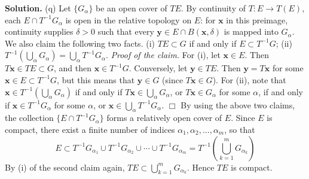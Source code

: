 \documentclass[12pt]{article}
\theoremstyle{definition}
\begin{document}
\smallskip
\noindent\textbf{Solution.}\quad
(q) Let $\{G_\alpha\}$ be an open cover of $TE$.  By continuity of $T:E\to T(E)$, each $E\cap T^{-1}G_\alpha$ is open in the relative topology on $E$: for $\mathbf{x}$ in this preimage, continuity supplies $\delta>0$ such that every $\mathbf y\in E\cap B(\mathbf x,\delta)$ is mapped into $G_\alpha$.
We also claim the following two facts.
(i) $TE\subset G$ if and only if $E\subset T^{-1}G$;
(ii) $T^{-1}\left(\bigcup_{\alpha}G_\alpha\right)=\bigcup_{\alpha}T^{-1}G_\alpha$.
\textit{Proof of the claim.} For (i), let $\mathbf{x}\in E$. Then $T\mathbf{x}\in TE\subset G$, and then $\mathbf{x}\in T^{-1}G$. Conversely, let $\mathbf{y}\in TE$. Then $\mathbf{y}=T\mathbf{x}$ for some $\mathbf{x}\in E\subset T^{-1}G$, but this means that $\mathbf{y}\in G$ (since $T\mathbf{x}\in G$). For (ii), note that $\mathbf{x}\in T^{-1}\left(\bigcup_{\alpha}G_\alpha\right)$ if and only if $T\mathbf{x}\in\bigcup_{\alpha}G_\alpha$, or $T\mathbf{x}\in G_{\alpha}$ for some $\alpha$, if and only if $\mathbf{x}\in T^{-1}G_\alpha$ for some $\alpha$, or $\mathbf{x}\in\bigcup_{\alpha}T^{-1}G_\alpha$. $\Box$
By using the above two claims, the collection $\{E\cap T^{-1}G_\alpha\}$ forms a relatively open cover of $E$. Since $E$ is compact, there exist a finite number of indices $\alpha_1,\alpha_2,\ldots,\alpha_m$, so that
$$
E\subset T^{-1}G_{\alpha_1}\cup T^{-1}G_{\alpha_2}\cup\cdots\cup T^{-1}G_{\alpha_m}
=T^{-1}\left(\bigcup_{k=1}^mG_{\alpha_k}\right)
$$
By (i) of the second claim again, $TE\subset \bigcup_{k=1}^mG_{\alpha_k}$. Hence $TE$ is compact.
\end{document}
